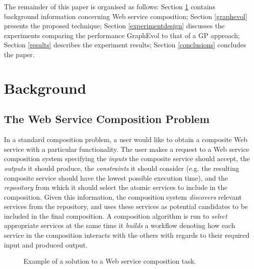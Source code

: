 \documentclass{article}
\begin{document}
The remainder of this paper is organised as follows:
Section \ref{background} contains background information concerning Web service composition; Section \ref{graphevol} presents the proposed technique;
Section \ref{experimentdesign} discusses the experiments comparing the performance GraphEvol to that of a GP approach;
Section \ref{results} describes the experiment results; Section \ref{conclusions} concludes the paper.

\section{Background}\label{background}

\subsection{The Web Service Composition Problem}

In a standard composition problem, a user would like to obtain a composite Web service with a particular functionality. The user makes a request to a Web
service composition system specifying the \textit{inputs} the composite service should accept, the \textit{outputs} it should produce, the \textit{constraints}
it should consider (e.g. the resulting composite service should have the lowest possible execution time), and the \textit{repository} from which it should select
the atomic services to include in the composition. Given this information, the composition system \textit{discovers} relevant services from the repository, and uses
these services as potential candidates to be included in the final composition. A composition algorithm is run to \textit{select} appropriate services at the same
time it \textit{builds} a workflow denoting how each service in the composition interacts with the others with regards to their required input and produced output.

\begin{figure}[h]
\centerline{
}
\caption{Example of a solution to a Web service composition task.}
\label{fig:compositionExample}
\end{figure}
\end{document}
